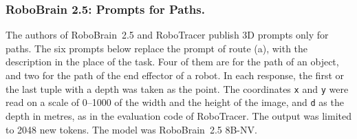 \subsubsection{RoboBrain 2.5: Prompts for Paths.}
The authors of RoboBrain~2.5 and RoboTracer publish 3D prompts only for paths.
The six prompts below replace the prompt of route (a), with the description in the place of the task.
Four of them are for the path of an object, and two for the path of the end effector of a robot.
In each response, the first or the last tuple with a depth was taken as the point.
The coordinates \texttt{x} and \texttt{y} were read on a scale of 0--1000 of the width and the height of the image, and \texttt{d} as the depth in metres, as in the evaluation code of RoboTracer.
The output was limited to 2048 new tokens.
The model was RoboBrain~2.5 8B-NV.

